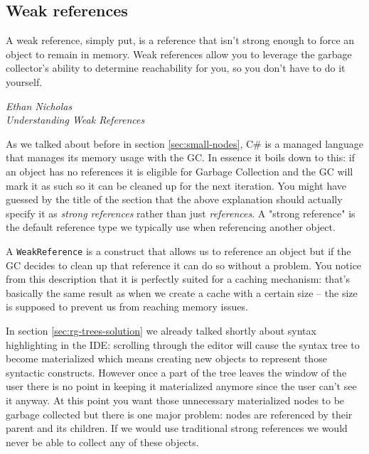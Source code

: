 \subsection{Weak references}
\label{sec:weak-references}

\epigraph{A weak reference, simply put, is a reference that isn't strong enough to force an object to remain in memory. Weak references allow you to leverage the garbage collector's ability to determine reachability for you, so you don't have to do it yourself.}
{\textit{Ethan Nicholas \\ \footnotesize{Understanding Weak References\protect\footnotemark}}}


As we talked about before in section \ref{sec:small-nodes}, C\# is a managed language that manages its memory usage with the GC. In essence it boils down to this: if an object has no references it is eligible for Garbage Collection and the GC will mark it as such so it can be cleaned up for the next iteration. You might have guessed by the title of the section that the above explanation should actually specify it as \textit{strong references} rather than just \textit{references}. A "strong reference" is the default reference type we typically use when referencing another object.

A \texttt{WeakReference} is a construct that allows us to reference an object but if the GC decides to clean up that reference it can do so without a problem. You notice from this description that it is perfectly suited for a caching mechanism: that's basically the same result as when we create a cache with a certain size -- the size is supposed to prevent us from reaching memory issues.

In section \ref{sec:rg-trees-solution} we already talked shortly about syntax highlighting in the IDE: scrolling through the editor will cause the syntax tree to become materialized which means creating new objects to represent those syntactic constructs. However once a part of the tree leaves the window of the user there is no point in keeping it materialized anymore since the user can't see it anyway. At this point you want those unnecessary materialized nodes to be garbage collected but there is one major problem: nodes are referenced by their parent and its children. If we would use traditional strong references we would never be able to collect any of these objects.

